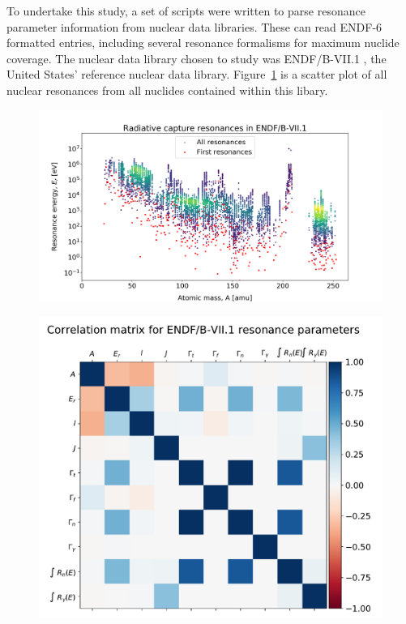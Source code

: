 To undertake this study, a set of scripts were written to parse resonance parameter information from nuclear data libraries. These can read ENDF-6 formatted entries, including several resonance formalisms for maximum nuclide coverage. The nuclear data library chosen to study was ENDF/B-VII.1 \cite{}, the United States' reference nuclear data library. Figure~\ref{fig:res_energy_mass} is a scatter plot of all nuclear resonances from all nuclides contained within this libary. 

\begin{figure}[H]
  \centering
  \includegraphics[width=\linewidth]{resonance_energy_atomic_mass}
  \caption{}
  \label{fig:res_energy_mass}
\end{figure}




\begin{figure}[H]
  \centering
  \includegraphics[width=\linewidth]{res_correlation}
  \caption{}
  \label{fig:}
\end{figure}

